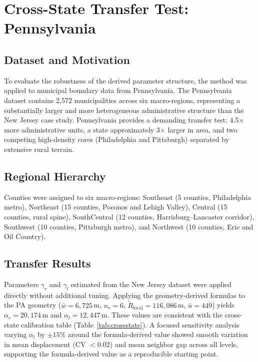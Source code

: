 \documentclass[12pt, a4paper]{article}
\numberwithin{equation}{section}
\begin{document}
\section{Cross-State Transfer Test: Pennsylvania}

\subsection{Dataset and Motivation}

To evaluate the robustness of the derived parameter structure, the method was applied to municipal boundary data from Pennsylvania. The Pennsylvania dataset contains 2{,}572 municipalities across six macro-regions, representing a substantially larger and more heterogeneous administrative structure than the New Jersey case study. Pennsylvania provides a demanding transfer test: 4.5$\times$ more administrative units, a state approximately 3$\times$ larger in area, and two competing high-density cores (Philadelphia and Pittsburgh) separated by extensive rural terrain.

\subsection{Regional Hierarchy}

Counties were assigned to six macro-regions: Southeast (5 counties, Philadelphia metro), Northeast (15 counties, Poconos and Lehigh Valley), Central (15 counties, rural spine), SouthCentral (12 counties, Harrisburg--Lancaster corridor), Southwest (10 counties, Pittsburgh metro), and Northwest (10 counties, Erie and Oil Country).

\subsection{Transfer Results}

Parameters $\gamma_r$ and $\gamma_l$ estimated from the New Jersey dataset were applied directly without additional tuning. Applying the geometry-derived formulas to the PA geometry ($\bar{w} = 6{,}725$\,m, $n_r = 6$, $\widetilde{R}_{\text{local}} = 116{,}086$\,m, $\bar{n} = 449$) yields $\alpha_r = 20{,}174$\,m and $\alpha_l = 12{,}447$\,m. These values are consistent with the cross-state calibration table (Table~\ref{tab:crossstate}). A focused sensitivity analysis varying $\alpha_l$ by $\pm 15\%$ around the formula-derived value showed smooth variation in mean displacement (CV $< 0.02$) and mean neighbor gap across all levels, supporting the formula-derived value as a reproducible starting point.
\end{document}
